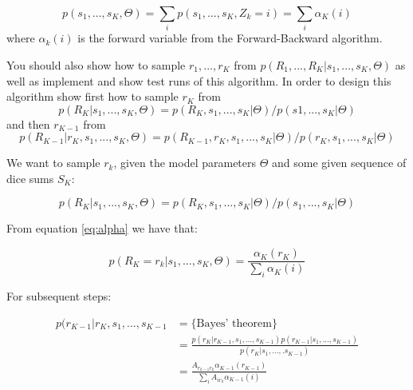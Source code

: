 \documentclass[12pt]{article}
\newenvironment{question}[2][Question]{\kern10pt \begin{trivlist}
\begin{tcolorbox}
\item[\hskip \labelsep {\bfseries #1}\hskip \labelsep {\bfseries #2.}]}
{\end{tcolorbox} \end{trivlist}}
\begin{document}
\begin{equation}
p(s_1, ..., s_K, \Theta) = \sum_i p(s_1,...,s_K, Z_k = i) = \sum_i \alpha_K(i)
\label{eq:alpha}
\end{equation}
where $\alpha_k(i)$ is the forward variable from the Forward-Backward algorithm.

\begin{question}{11}
You should also show how to sample $r_1, ..., r_K$ from $p(R_1, ..., R_K \vert s_1, ..., s_K, \Theta)$ as well as implement and show test runs of this algorithm. In order to design this algorithm show first how to sample $r_K$ from $$p(R_K \vert s_1, ..., s_K, \Theta) = p(R_K, s_1, ..., s_K| \Theta)/p(s1, ..., s_K \vert \Theta)$$
and then $r_{K-1}$ from 
$$p(R_{K-1} \vert r_K, s_1, ..., s_K, \Theta) = p(R_{K-1}, r_K, s_1, ..., s_K \vert \Theta)/p(r_K, s_1, ..., s_K \vert \Theta)$$
\end{question}

We want to sample $r_k$, given the model parameters $\Theta$ and some given sequence of dice sums $S_K$:

$$p(R_K \vert s_1, ..., s_K, \Theta) = p(R_K, s_1, ..., s_K \vert \Theta) / p(s_1, ..., s_K \vert \Theta)$$

From equation \ref{eq:alpha} we have that:

\begin{equation}
p(R_K = r_k \vert s_1, ..., s_K, \Theta) = \frac{\alpha_K(r_K)}{\sum_i \alpha_K(i)}
\end{equation}

For subsequent steps:

\begin{equation}
\begin{split}
p(r_{K-1} \vert r_K, s_1, ..., s_{K-1} &= \big \{ \text{Bayes' theorem} \big \}
\\
&= \frac{p(r_K \vert r_{K-1}, s_1, ..., s_{K-1}) p(r_{K-1} \vert s_1, ..., s_{K-1})}{p(r_K \vert s_1, ...,. s_{K-1})}
\\
&= \frac{A_{r_{k-1}r_k} \alpha_{K-1} (r_{K-1})}{\sum_i A_{i{r_k}} \alpha_{K-1}(i)}
\end{split}
\end{equation}

 
\end{document}
